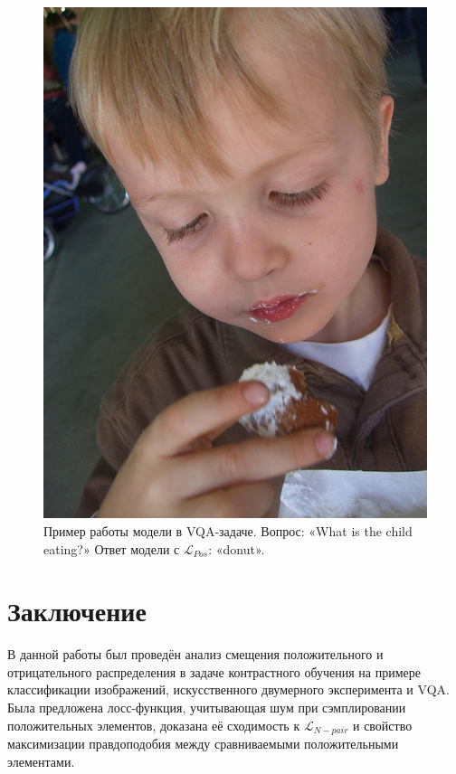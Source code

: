 \documentclass[a4paper, 14pt]{article}
\begin{document}
\begin{figure}[!ht]
    \begin{center}
    \includegraphics[scale = 0.45]{Pictures/contrastive_example.png}
    \caption{Пример работы модели в VQA-задаче. Вопрос: «What is the child eating?» Ответ модели с $\mathcal{L}_{Pos}$: «donut».}
    \label{fg:vqa}
    \end{center}
\end{figure}

\newpage
\section{Заключение}
В данной работы был проведён анализ смещения положительного и отрицательного распределения в задаче контрастного обучения на примере классификации изображений, искусственного двумерного эксперимента и VQA. Была предложена лосс-функция, учитывающая шум при сэмплировании положительных элементов, доказана её сходимость к $\mathcal{L}_{N-pair}$ и свойство максимизации правдоподобия между сравниваемыми положительными элементами.

\newpage


\end{document}
